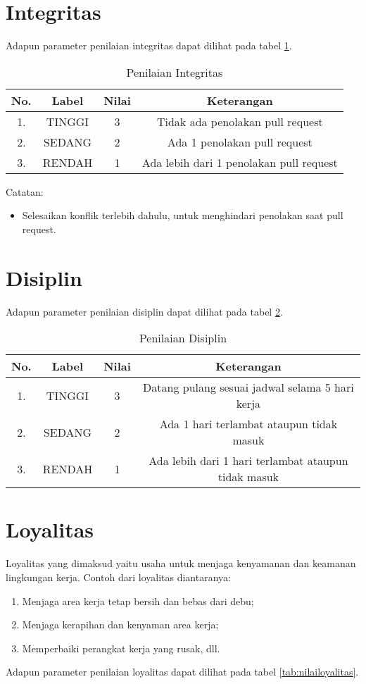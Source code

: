 \section{Integritas}

Adapun parameter penilaian integritas dapat dilihat pada tabel \ref{tab:nilaiintegritas}.

\begin{table}[h]
\caption{Penilaian Integritas}
\centering
\begin{tabular}{|c|c|c|c|}
\hline
\textbf{No.}&\textbf{Label}&\textbf{Nilai}&\textbf{Keterangan}\\
\hline
1.&TINGGI&3&Tidak ada penolakan pull request\\
\hline
2.&SEDANG&2&Ada 1 penolakan pull request\\
\hline
3.&RENDAH&1&Ada lebih dari 1 penolakan pull request\\
\hline
\end{tabular}
\label{tab:nilaiintegritas}
\end{table}

Catatan:
\begin{itemize}
\item Selesaikan konflik terlebih dahulu, untuk menghindari penolakan saat pull request.
\end{itemize}

\section{Disiplin}

Adapun parameter penilaian disiplin dapat dilihat pada tabel \ref{tab:nilaidisiplin}.

\begin{table}[h]
\caption{Penilaian Disiplin}
\centering
\begin{tabular}{|c|c|c|c|}
\hline
\textbf{No.}&\textbf{Label}&\textbf{Nilai}&\textbf{Keterangan}\\
\hline
1.&TINGGI&3&Datang pulang sesuai jadwal selama 5 hari kerja\\
\hline
2.&SEDANG&2&Ada 1 hari terlambat ataupun tidak masuk\\
\hline
3.&RENDAH&1&Ada lebih dari 1 hari terlambat ataupun tidak masuk\\
\hline
\end{tabular}
\label{tab:nilaidisiplin}
\end{table}

\section{Loyalitas}
Loyalitas yang dimaksud yaitu usaha untuk menjaga kenyamanan dan keamanan lingkungan kerja. Contoh dari loyalitas diantaranya:
\begin{enumerate}
\item Menjaga area kerja tetap bersih dan bebas dari debu;
\item Menjaga kerapihan dan kenyaman area kerja;
\item Memperbaiki perangkat kerja yang rusak, dll.
\end{enumerate}
Adapun parameter penilaian loyalitas dapat dilihat pada tabel \ref{tab:nilailoyalitas}.

